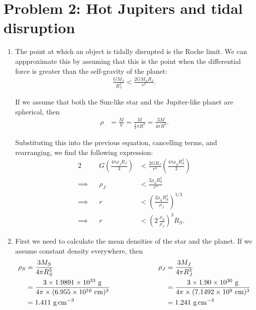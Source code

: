 \documentclass[11pt,letterpaper]{article}
\begin{document}
\section*{Problem 2: Hot Jupiters and tidal disruption}

\begin{enumerate}[label=(\alph*)]
    \item The point at which an object is tidally disrupted is the Roche limit. We can appproximate this by assuming that this is the point when the differential force is greater than the self-gravity of the planet: 
        \begin{align*}
            \frac{GM_J}{R_J^2} < \frac{2GM_SR_J}{r^3}.
        \end{align*}

        If we assume that both the Sun-like star and the Jupiter-like planet are spherical, then 
        \begin{align*}
            \rho &= \frac{M}{V} = \frac{M}{\frac{4}{3}\pi R^3} = \frac{3M}{4\pi R^3}.        \end{align*}

        Substituting this into the previous equation, cancelling terms, and rearranging, we find the following expression:
        \begin{alignat*}{2}
            &&G \left(\frac{4\pi\rho_J R_J}{3}\right) &<  \frac{2GR_J}{r^3}\left(\frac{4\pi\rho_S R_S^3}{3}\right) \\
            \implies&& \rho_J &< \frac{2\rho_S R_S^3}{r^3} \\
            \implies&& r &< \left(\frac{2\rho_S R_S^3}{\rho_J}\right)^{1/3} \\
            \implies&& r &< \left(2\,\frac{\rho_S}{\rho_J}\right)^3 R_S.
        \end{alignat*}

    \item First we need to calculate the mean densities of the star and the planet. If we assume constant density everywhere, then 
        \begin{alignat*}{2}
            \rho_S &= \frac{3M_S}{4\pi R_S^3} &\qquad\qquad\qquad \rho_J &= \frac{3M_J}{4\pi R_J^3} \\
                   &= \frac{3\times 1.9891\times 10^{33}~{\rm g}}{4\pi\times (6.955\times 10^{10}~{\rm cm})^3} &&= \frac{3\times 1.90\times 10^{30}~{\rm g}}{4\pi\times (7.1492\times 10^{9}~{\rm cm})^3} \\
                   &= 1.411~{\rm g\,cm^{-3}} &&= 1.241~{\rm g\,cm^{-3}} 
        \end{alignat*}


\end{enumerate}
\end{document}
